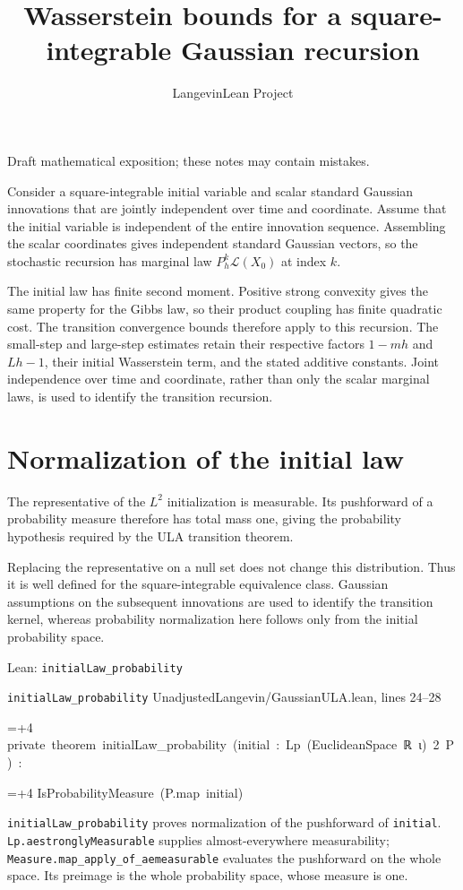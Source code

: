 \documentclass[11pt,a4paper]{article}
\title{\texorpdfstring{Wasserstein bounds for a square-integrable Gaussian recursion}{Wasserstein bounds for a square-integrable Gaussian recursion}}
\author{LangevinLean Project}
\date{}
\newlength{\leancharwidth}
\newenvironment{leancode}{\par\smallskip\begingroup\ttfamily\footnotesize\raggedright
  \settowidth{\leancharwidth}{M}\setlength{\parskip}{0pt}\setlength{\parindent}{0pt}
  \frenchspacing}{\par\endgroup\smallskip}
\newcommand{\leanline}[2]{\hangindent=\dimexpr#1\leancharwidth+4\leancharwidth\relax
  \hangafter=1\noindent\hspace*{#1\leancharwidth}#2\par}
\newcommand{\leansource}[1]{\par{\footnotesize\color{leanmuted}#1}\par}
\newcommand{\leanlabel}[1]{\par\smallskip\noindent{\small\bfseries #1}\par}
\begin{document}
\maketitle
Draft mathematical exposition; these notes may contain mistakes.


Consider a square-integrable initial variable and scalar standard Gaussian innovations that are jointly independent over time and coordinate. Assume that the initial variable is independent of the entire innovation sequence. Assembling the scalar coordinates gives independent standard Gaussian vectors, so the stochastic recursion has marginal law \(P_h^k\mathcal L(X_0)\) at index \(k\).



The initial law has finite second moment. Positive strong convexity gives the same property for the Gibbs law, so their product coupling has finite quadratic cost. The transition convergence bounds therefore apply to this recursion. The small-step and large-step estimates retain their respective factors \(1-mh\) and \(Lh-1\), their initial Wasserstein term, and the stated additive constants. Joint independence over time and coordinate, rather than only the scalar marginal laws, is used to identify the transition recursion.


\section{\texorpdfstring{Normalization of the initial law}{Normalization of the initial law}}


The representative of the \(L^2\) initialization is measurable. Its pushforward of a probability measure therefore has total mass one, giving the probability hypothesis required by the ULA transition theorem.



Replacing the representative on a null set does not change this distribution. Thus it is well defined for the square-integrable equivalence class. Gaussian assumptions on the subsequent innovations are used to identify the transition kernel, whereas probability normalization here follows only from the initial probability space.

\begin{leanbox}{Lean: \texttt{initialLaw\_\allowbreak{}probability}}
\leansource{\texttt{initialLaw\_\allowbreak{}probability} \quad UnadjustedLangevin/\allowbreak{}GaussianULA.lean, lines 24–28}
\begin{leancode}
\leanline{0}{private\ theorem\ initialLaw\_probability\ (initial\ :\ Lp\ (EuclideanSpace\ ℝ\ ι)\ 2\ P)\ :}
\leanline{4}{IsProbabilityMeasure\ (P.map\ initial)}
\end{leancode}
\leanlabel{How the Lean proof follows the argument}
\texttt{initial\allowbreak{}Law\_\allowbreak{}probability} proves normalization of the pushforward of \texttt{initial}. \texttt{Lp.\allowbreak{}aestrongly\allowbreak{}Measurable} supplies almost-everywhere measurability; \texttt{Measure.\allowbreak{}map\_\allowbreak{}apply\_\allowbreak{}of\_\allowbreak{}aemeasurable} evaluates the pushforward on the whole space. Its preimage is the whole probability space, whose measure is one.
\end{leanbox}
\end{document}

